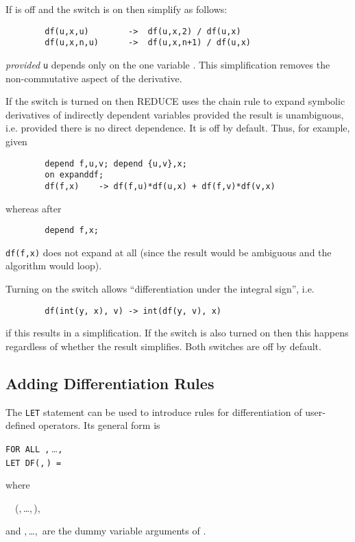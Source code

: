 If  is off and the switch 
is on then simplify as follows:
\begin{verbatim}
        df(u,x,u)        ->  df(u,x,2) / df(u,x)
        df(u,x,n,u)      ->  df(u,x,n+1) / df(u,x)
\end{verbatim}
\emph{provided} \texttt{u} depends only on the one variable .
This simplification removes the non-commutative aspect of the derivative.

\hypertarget{switch:EXPANDDF}{}
If the switch  is turned on then REDUCE uses
the chain rule to expand symbolic derivatives of indirectly dependent variables
provided the result is unambiguous, i.e. provided there is no direct dependence.
It is off by default.  Thus, for example, given
\begin{verbatim}
        depend f,u,v; depend {u,v},x;
        on expanddf;
        df(f,x)    -> df(f,u)*df(u,x) + df(f,v)*df(v,x)
\end{verbatim}
whereas after
\begin{verbatim}
        depend f,x;
\end{verbatim}
\texttt{df(f,x)} does not expand at all (since the result would be ambiguous
and the algorithm would loop).

\hypertarget{switch:ALLOWDFINT}{}
\hypertarget{switch:DFINT}{}
Turning on the switch  allows
``differentiation under the integral sign'', i.e.
\begin{verbatim}
        df(int(y, x), v) -> int(df(y, v), x)
\end{verbatim}
if this results in a simplification.  If the switch 
is also turned on then this happens regardless of whether the result
simplifies. Both switches are off by default.


\subsection{Adding Differentiation Rules}
\hypertarget{command:LETdf}{}

The \texttt{LET} statement can be used to introduce
rules for differentiation of user-defined operators.  Its general form is
\begin{syntaxtable}
  \texttt{FOR ALL }\texttt{,}\,\dots\texttt{,}\, \\
    \qquad \texttt{LET DF(}\texttt{,}\,\texttt{)
    = }
\end{syntaxtable}
where
\begin{syntax}
  \ \BNFprod\ (,\,\dots,\,),
\end{syntax}
and
,\,\dots,\, are the dummy variable arguments of
.

